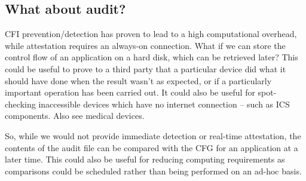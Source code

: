 \subsection{What about audit?}
CFI prevention/detection has proven to lead to a high computational overhead, while attestation requires an always-on connection. What if we can store the control flow of an application on a hard disk, which can be retrieved later? This could be useful to prove to a third party that a particular device did what it should have done when the result wasn’t as expected, or if a particularly important operation has been carried out. It could also be useful for spot-checking inaccessible devices which have no internet connection – such as ICS components. Also see medical devices.

So, while we would not provide immediate detection or real-time attestation, the contents of the audit file can be compared with the CFG for an application at a later time. This could also be useful for reducing computing requirements as comparisons could be scheduled rather than being performed on an ad-hoc basis.
